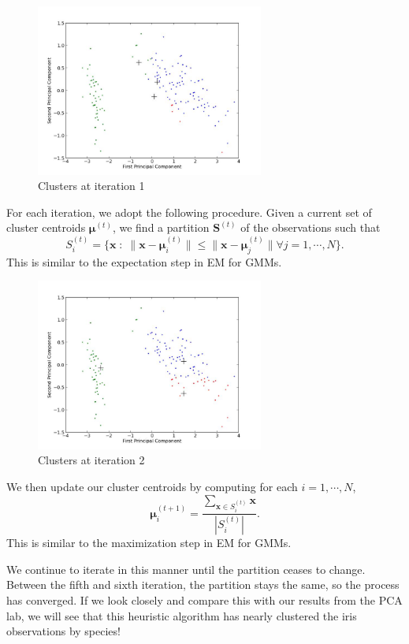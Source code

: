 \begin{figure}[h]
	\begin{center}
	\includegraphics[width=7.5cm]{iteration1.jpg}
	\end{center}
	\caption{Clusters at iteration 1}
\end{figure}

For each iteration, we adopt the following procedure. Given a current set of cluster centroids $\mathbf{\mu}^{(t)}$, we find a partition $\mathbf{S}^{(t)}$ of the observations such that $$S_{i}^{(t)} = \{\mathbf{x} \; : \; \| \mathbf{x} - \mathbf{\mu}_{i}^{(t)}\| \leq \| \mathbf{x} - \mathbf{\mu}_{j}^{(t)}\| \forall j = 1, \cdots, N\}.$$ This is similar to the expectation step in EM for GMMs.

\begin{figure}[h]
	\begin{center}
	\includegraphics[width=7.5cm]{iteration2.jpg}
	\end{center}
	\caption{Clusters at iteration 2}
\end{figure}

We then update our cluster centroids by computing for each $i = 1, \cdots, N$, $$\mathbf{\mu}_{i}^{(t+1)} = \frac{\sum_{\mathbf{x} \in S_{i}^{(t)}} \mathbf{x}}{|S_{i}^{(t)}|}.$$ This is similar to the maximization step in EM for GMMs.

We continue to iterate in this manner until the partition ceases to change. Between the fifth and sixth iteration, the partition stays the same, so the process has converged. If we look closely and compare this with our results from the PCA lab, we will see that this heuristic algorithm has nearly clustered the iris observations by species!

